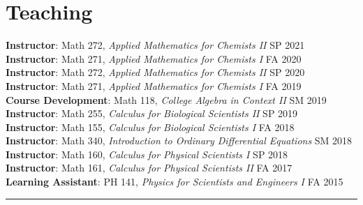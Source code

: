 \documentclass[12pt]{article} %
\begin{document}
\section{Teaching}
\begin{flushleft}
\textbf{Instructor}: Math 272, \emph{Applied Mathematics for Chemists II} \hfill SP 2021\\
\vspace*{5pt}
\textbf{Instructor}: Math 271, \emph{Applied Mathematics for Chemists I} \hfill FA 2020\\
\vspace*{5pt}
\textbf{Instructor}: Math 272, \emph{Applied Mathematics for Chemists II} \hfill SP 2020\\
\vspace*{5pt}
\textbf{Instructor}: Math 271, \emph{Applied Mathematics for Chemists I} \hfill FA 2019\\
\vspace*{5pt}
\textbf{Course Development}: Math 118, \emph{College Algebra in Context II} \hfill SM 2019\\
\vspace*{5pt}
\textbf{Instructor}: Math 255, \emph{Calculus for Biological Scientists II} \hfill SP 2019\\
\vspace*{5pt}
\textbf{Instructor}: Math 155, \emph{Calculus for Biological Scientists I} \hfill FA 2018\\
\vspace*{5pt}
\textbf{Instructor}: Math 340, \emph{Introduction to Ordinary Differential Equations} \hfill SM 2018\\
\vspace*{5pt}
\textbf{Instructor}: Math 160, \emph{Calculus for Physical Scientists I} \hfill SP 2018\\
\vspace*{5pt}
\textbf{Instructor}: Math 161, \emph{Calculus for Physical Scientists II} \hfill FA 2017\\
\vspace*{5pt}
\textbf{Learning Assistant}: PH 141, \emph{Physics for Scientists and Engineers I} \hfill FA 2015
\end{flushleft}
\rule{\textwidth}{0.5mm}

\end{document}
